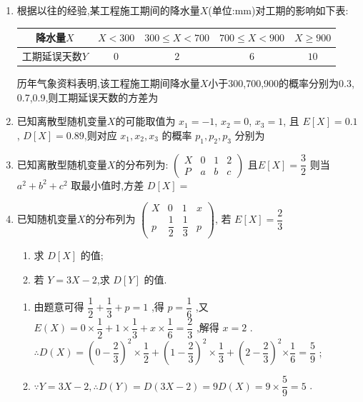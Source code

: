 \begin{enumerate}
\item 根据以往的经验,某工程施工期间的降水量$X$(单位:mm)对工期的影响如下表:
\begin{center}
\begin{tabular}{|c|c|c|c|c|}
\hline
降水量$X$ & $X<300$ & $300\le X<700$ & $700\le X<900$ & $X\ge900$ \\
\hline
工期延误天数$Y$ & $0$ & $2$ & $6$ & $10$ \\
\hline
\end{tabular}
\end{center}
历年气象资料表明,该工程施工期间降水量$X$小于300,700,900的概率分别为0.3, 0.7,0.9,则工期延误天数的方差为

\item 已知离散型随机变量$X$的可能取值为 $x_{1}=-1$, $x_{2}=0$, $x_{3}=1$, 且 $E[X]=0.1$, $D[X]=0.89$,则对应 $x_{1},x_{2},x_{3}$ 的概率 $p_{1},p_{2},p_{3}$ 分别为

\item 已知离散型随机变量$X$的分布列为: $\begin{pmatrix}X&0&1&2\\ P&a&b&c\end{pmatrix}$ 且$E[X]=\dfrac{3}{2}$ 则当$a^{2}+b^{2}+c^{2}$ 取最小值时,方差 $D[X]=$

\item 已知随机变量$X$的分布列为 $\begin{pmatrix}X&0&1&x\\ p&\dfrac{1}{2}&\dfrac{1}{3}&p\end{pmatrix}$, 若 $E[X]=\dfrac{2}{3}$
\begin{enumerate}
\item 求 $D[X]$ 的值;
\item 若 $Y=3X-2$,求 $D[Y]$ 的值.
\end{enumerate}
\begin{jieda}
    \begin{enumerate}
        \item 由题意可得 $\dfrac{1}{2} + \dfrac{1}{3} + p = 1$ ,得 $p = \dfrac{1}{6}$ ,又$E\left( X\right)  = 0 \times  \dfrac{1}{2} + 1 \times  \dfrac{1}{3} + x \times  \dfrac{1}{6} = \dfrac{2}{3}$ ,解得 $x = 2$ .$\therefore D\left( X\right)  = {\left( 0 - \dfrac{2}{3}\right) }^{2} \times  \dfrac{1}{2} + {\left( 1 - \dfrac{2}{3}\right) }^{2} \times  \dfrac{1}{3} + {\left( 2 - \dfrac{2}{3}\right) }^{2}$$\times  \dfrac{1}{6} = \dfrac{5}{9}$ ;
        \item $\because Y = {3X} - 2,\therefore D\left( Y\right)  = D\left( {{3X} - 2}\right)  = {9D}\left( X\right)  = 9 \times$$\dfrac{5}{9} = 5$ .
    \end{enumerate}
\end{jieda}


\end{enumerate}
